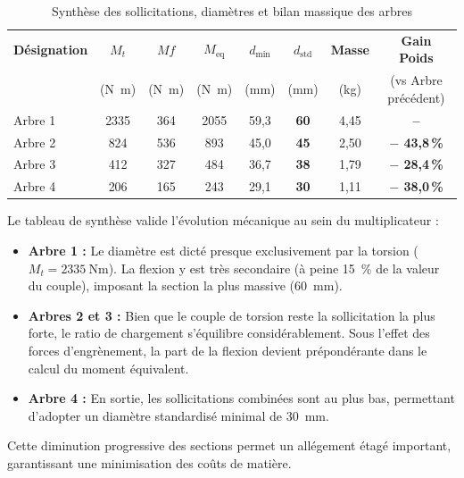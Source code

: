 \documentclass[11pt,a4paper]{article}
\begin{document}
\begin{table}[H]
    \centering
    \caption{Synthèse des sollicitations, diamètres et bilan massique des arbres}
    \label{tab:synthese_arbres}
    \small
    \begin{tabular}{l c c c c c c c}
        \toprule
        \textbf{Désignation} & \textbf{$M_t$} & \textbf{$Mf$} & \textbf{$M_{\text{eq}}$} & \textbf{$d_{\min}$} & \textbf{$d_{\text{std}}$} & \textbf{Masse} & \textbf{Gain Poids} \\
                             & (\unit{\newton\meter}) & (\unit{\newton\meter}) & (\unit{\newton\meter}) & (\unit{\milli\meter}) & (\unit{\milli\meter}) & (\unit{\kilogram}) & (vs Arbre précédent) \\
        \midrule
        Arbre 1 & 2335 & 364 & 2055 & 59{,}3 & \textbf{60} & 4{,}45 & \textbf{--} \\
        Arbre 2 & 824  & 536 & 893  & 45{,}0 & \textbf{45} & 2{,}50 & \textbf{$-$ 43{,}8\,\%} \\
        Arbre 3 & 412  & 327 & 484  & 36{,}7 & \textbf{38} & 1{,}79 & \textbf{$-$ 28{,}4\,\%} \\
        Arbre 4 & 206  & 165 & 243  & 29{,}1 & \textbf{30} & 1{,}11 & \textbf{$-$ 38{,}0\,\%} \\
        \bottomrule
    \end{tabular}
\end{table}

\begin{tcolorbox}[colback=BoxBg, colframe=TealAccent, arc=4pt, boxrule=1pt, title=\textbf{Analyse globale de la ligne de transmission}]
Le tableau de synthèse valide l'évolution mécanique au sein du multiplicateur :
\begin{itemize}
    \item \textbf{Arbre 1 :} Le diamètre est dicté presque exclusivement par la torsion ($M_t = \qty{2335}{\newton\meter}$). La flexion y est très secondaire (à peine \qty{15}{\percent} de la valeur du couple), imposant la section la plus massive (\qty{60}{\milli\meter}).
    \item \textbf{Arbres 2 et 3 :} Bien que le couple de torsion reste la sollicitation la plus forte, le ratio de chargement s'équilibre considérablement. Sous l'effet des forces d'engrènement, la part de la flexion devient prépondérante dans le calcul du moment équivalent.
    \item \textbf{Arbre 4 :} En sortie, les sollicitations combinées sont au plus bas, permettant d'adopter un diamètre standardisé minimal de \qty{30}{\milli\meter}.
\end{itemize}
Cette diminution progressive des sections permet un allégement étagé important, garantissant une minimisation des coûts de matière.
\end{tcolorbox}
\end{document}
